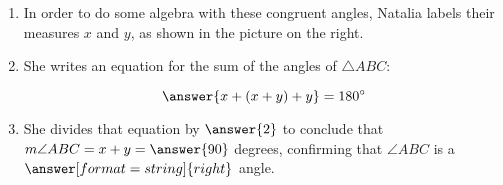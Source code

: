 \documentclass[handout,nooutcomes]{ximera}
\begin{document}
\begin{problem}
\begin{enumerate}
\item In order to do some algebra with these congruent angles, Natalia labels their measures $x$ and $y$, as shown in the picture on the right.  

\item She writes an equation for the sum of the angles of $\triangle ABC$: 

\[
\answer{x+(x+y)+y} = 180^\circ
\]

\item She divides that equation by $\answer{2}$ to conclude that $m\angle ABC = x+y = \answer{90}$ degrees, confirming that $\angle ABC$ is a
$\answer[format=string]{right}$ angle.  

\end{enumerate}
\end{problem}
\end{document}
